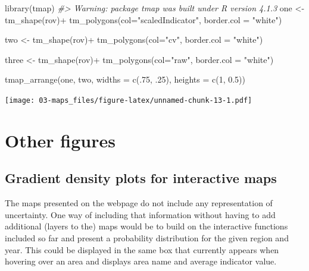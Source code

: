 \documentclass[
]{book}
\newenvironment{Shaded}{\begin{snugshade}}{\end{snugshade}}
\newcommand{\AttributeTok}[1]{\textcolor[rgb]{0.77,0.63,0.00}{#1}}
\newcommand{\CommentTok}[1]{\textcolor[rgb]{0.56,0.35,0.01}{\textit{#1}}}
\newcommand{\DecValTok}[1]{\textcolor[rgb]{0.00,0.00,0.81}{#1}}
\newcommand{\FloatTok}[1]{\textcolor[rgb]{0.00,0.00,0.81}{#1}}
\newcommand{\FunctionTok}[1]{\textcolor[rgb]{0.00,0.00,0.00}{#1}}
\newcommand{\NormalTok}[1]{#1}
\newcommand{\OtherTok}[1]{\textcolor[rgb]{0.56,0.35,0.01}{#1}}
\newcommand{\SpecialCharTok}[1]{\textcolor[rgb]{0.00,0.00,0.00}{#1}}
\newcommand{\StringTok}[1]{\textcolor[rgb]{0.31,0.60,0.02}{#1}}
\begin{document}
\begin{Shaded}
\begin{Highlighting}[]
\FunctionTok{library}\NormalTok{(tmap)}
\CommentTok{\#\textgreater{} Warning: package \textquotesingle{}tmap\textquotesingle{} was built under R version 4.1.3}
\NormalTok{one }\OtherTok{\textless{}{-}} \FunctionTok{tm\_shape}\NormalTok{(rov)}\SpecialCharTok{+}
  \FunctionTok{tm\_polygons}\NormalTok{(}\AttributeTok{col=}\StringTok{"scaledIndicator"}\NormalTok{, }
              \AttributeTok{border.col =} \StringTok{"white"}\NormalTok{)}

\NormalTok{two }\OtherTok{\textless{}{-}} \FunctionTok{tm\_shape}\NormalTok{(rov)}\SpecialCharTok{+}
  \FunctionTok{tm\_polygons}\NormalTok{(}\AttributeTok{col=}\StringTok{"cv"}\NormalTok{, }
              \AttributeTok{border.col =} \StringTok{"white"}\NormalTok{)}

\NormalTok{three }\OtherTok{\textless{}{-}} \FunctionTok{tm\_shape}\NormalTok{(rov)}\SpecialCharTok{+}
  \FunctionTok{tm\_polygons}\NormalTok{(}\AttributeTok{col=}\StringTok{"raw"}\NormalTok{, }
              \AttributeTok{border.col =} \StringTok{"white"}\NormalTok{)}


\FunctionTok{tmap\_arrange}\NormalTok{(one, two, }
             \AttributeTok{widths =} \FunctionTok{c}\NormalTok{(.}\DecValTok{75}\NormalTok{, .}\DecValTok{25}\NormalTok{),}
             \AttributeTok{heights =} \FunctionTok{c}\NormalTok{(}\DecValTok{1}\NormalTok{, }\FloatTok{0.5}\NormalTok{))}
\end{Highlighting}
\end{Shaded}

\texttt{[image: 03-maps\_files/figure-latex/unnamed-chunk-13-1.pdf]}

\hypertarget{other-figures}{%
\chapter{Other figures}\label{other-figures}}

\hypertarget{gradient-density-plots-for-interactive-maps}{%
\section{Gradient density plots for interactive maps}\label{gradient-density-plots-for-interactive-maps}}

The maps presented on the webpage do not include any representation of uncertainty. One way of including that information without having to add additional (layers to the) maps would be to build on the interactive functions included so far and present a probability distribution for the given region and year. This could be displayed in the same box that currently appears when hovering over an area and displays area name and average indicator value.
\end{document}
